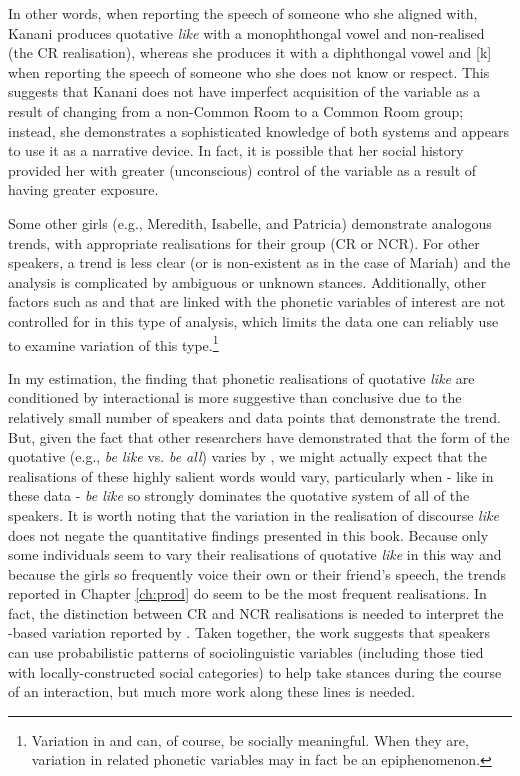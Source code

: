 In other words, when reporting the speech of someone who she aligned with, Kanani produces quotative \textit{like} with a monophthongal vowel and non-realised  (the CR realisation), whereas she produces it with a diphthongal vowel and [k] when reporting the speech of someone who she does not know or respect.  This suggests that Kanani does not have imperfect acquisition of the variable as a result of changing from a non-Common Room to a Common Room group; instead, she demonstrates a sophisticated knowledge of both systems and appears to use it as a narrative device. In fact, it is possible that her social history provided her with greater (unconscious) control of the variable as a result of having greater exposure.

Some other girls (e.g., Meredith, Isabelle, and Patricia) demonstrate analogous trends, with appropriate realisations for their group (CR or NCR).  For other speakers, a trend is less clear (or is non-existent as in the case of Mariah) and the analysis is complicated by ambiguous or unknown stances.  Additionally, other factors such as  and  that are linked with the phonetic variables of interest are not controlled for in this type of analysis, which limits the data one can reliably use to examine variation of this type.\footnote{Variation in  and  can, of course, be socially meaningful.  When they are, variation in related phonetic variables may in fact be an epiphenomenon.}  

In my estimation, the finding that phonetic realisations of quotative \textit{like} are conditioned by interactional  is more suggestive than conclusive due to the relatively small number of speakers and data points that demonstrate the trend. But, given the fact that other researchers have demonstrated that the form of the quotative (e.g., \textit{be like} vs. \textit{be all}) varies by , we might actually expect that the realisations of these highly salient words would vary, particularly when - like in these data - \textit{be like} so strongly dominates the quotative system of all of the speakers.  It is worth noting that the variation in the realisation of discourse \textit{like} does not negate the quantitative findings presented in this book.  Because only some individuals seem to vary their realisations of quotative \textit{like} in this way and because the girls so frequently voice their own or their friend's speech, the trends reported in Chapter \ref{ch:prod} do seem to be the most frequent realisations.  In fact, the distinction between CR and NCR realisations is needed to interpret the -based variation reported by \citet{dragerinpress-DPVC}.  Taken together, the work suggests that speakers can use probabilistic patterns of sociolinguistic variables (including those tied with locally-constructed social categories) to help take stances during the course of an interaction, but much more work along these lines is needed.




